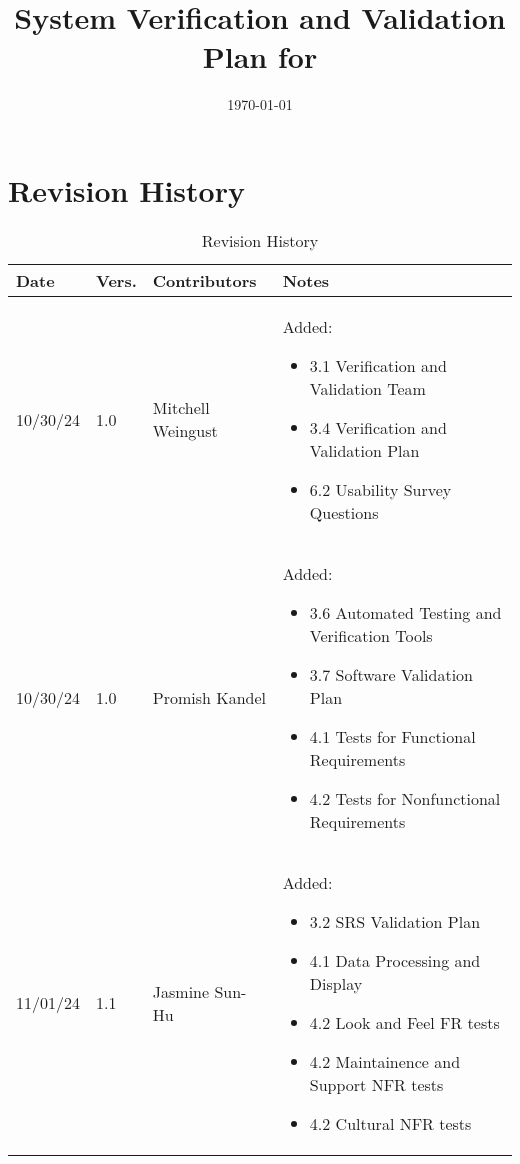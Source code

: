 \documentclass[12pt, titlepage]{article}
\begin{document}
\title{System Verification and Validation Plan for \progname{}} 
\author{\authname}
\date{\today}
	
\maketitle


\section*{Revision History}

\begin{table}[hp]
  \caption{Revision History} \label{TblRevisionHistory}
  \begin{tabularx}{\textwidth}{p{1.5cm}p{1cm}p{3.5cm}X}
  \toprule {\textbf{Date}} & {\textbf{Vers.}} & {\textbf{Contributors}} & {\textbf{Notes}}\\
  \midrule
  10/30/24 & 1.0 & Mitchell Weingust & Added:\begin{itemize}[leftmargin=*]
    \item 3.1 Verification and Validation Team
    \item 3.4 Verification and Validation Plan
    \item 6.2 Usability Survey Questions
  \end{itemize}\\
  10/30/24 & 1.0 & Promish Kandel & Added:\begin{itemize}[leftmargin=*]
    \item 3.6 Automated Testing and Verification Tools
    \item 3.7 Software Validation Plan
    \item 4.1 Tests for Functional Requirements 
    \item 4.2 Tests for Nonfunctional Requirements
  \end{itemize}\\
  11/01/24 & 1.1 & Jasmine Sun-Hu & Added:\begin{itemize}[leftmargin=*]
    \item 3.2 SRS Validation Plan
    \item 4.1 Data Processing and Display
    \item 4.2 Look and Feel FR tests
    \item 4.2 Maintainence and Support NFR tests
    \item 4.2 Cultural NFR tests
  \end{itemize}\\

\end{tabularx}
\end{table}
\end{document}
